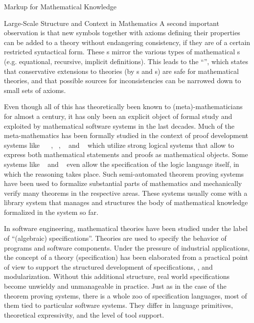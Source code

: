 \begin{tchapter}[id=math-markup]{Markup for Mathematical Knowledge}
\begin{tsection}[id=meta-theories]{Large-Scale Structure and Context in Mathematics}
  A second important observation is that new symbols together with axioms defining their
  properties can be added to a theory without endangering consistency, if they are of a
  certain restricted syntactical form. These {s} mirror the
  various types of mathematical {s} (e.g. equational, recursive,
  implicit definitions).  This leads to the ``{\emph{}}'', which states that conservative extensions to
  theories (by {s} and {s}) are safe for
  mathematical theories, and that possible sources for inconsistencies
  can be narrowed down to small sets of axioms.

  Even though all of this has theoretically been known to (meta)-mathema\-ticians for
  almost a century, it has only been an explicit object of formal study and exploited by
  mathematical software systems in the last decades. Much of the meta-mathematics has been
  formally studied in the context of proof development systems like
  {\automath}~\cite{Bruijn80} {\nuprl}~\cite{Constable86}, {\hol}~\cite{GoMe93},
  {\mizar}~\cite{Rudnicki:aomp92} and {\OMEGA}~\cite{BenzmuellerEtAl:otama97} which
  utilize strong logical systems that allow to express both mathematical statements and
  proofs as mathematical objects.  Some systems like {\isabelle}~\cite{Paulson90} and
  {}~\cite{Pfenning91} even allow the specification of the logic language
  itself, in which the reasoning takes place.  Such semi-automated theorem proving systems
  have been used to formalize substantial parts of mathematics and mechanically verify
  many theorems in the respective areas. These systems usually come with a library system
  that manages and structures the body of mathematical knowledge formalized in the system
  so far.

  In software engineering, mathematical theories have been studied under the label of
  ``(algebraic) specifications''. Theories are used to
  specify the behavior of programs and software components. Under the pressure of
  industrial applications, the concept of a theory (specification) has been elaborated
  from a practical point of view to support the structured development of specifications,
  {}, and modularization.  Without this additional structure, real
  world specifications become unwieldy and unmanageable in practice. Just as in the case
  of the theorem proving systems, there is a whole zoo of specification languages, most of
  them tied to particular software systems.  They differ in language primitives,
  theoretical expressivity, and the level of tool support.


\end{tsection}
\end{tchapter}
